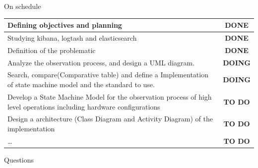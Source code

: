 \documentclass[11pt]{beamer}
\begin{document}
\begin{frame}
	\begin{alertblock}{On schedule}
	
		\begin{tabular}{p{10cm}|c}
			Defining objectives and planning & \textbf{\color{green} DONE}\\
			\hline
			Studying kibana, logtash and elasticsearch & \textbf{\color{green} DONE} \\
			\hline
			Definition of the problematic & \textbf{\color{green} DONE} \\
			\hline
			Analyze the observation process, and design a UML diagram. & \textbf{\color{orange} DOING} \\
			\hline
			Search, compare(Comparative table) and define a Implementation of state machine model and the standard to use. & \textbf{\color{orange} DOING} \\
			\hline
			Develop a State Machine Model for the observation process of high level operations including hardware configurations & \textbf{\color{red} TO DO} \\
			\hline
			Design a architecture (Class Diagram and Activity Diagram) of the implementation & \textbf{\color{red} TO DO} \\
			\hline
			\ldots & \textbf{\color{red} TO DO} \\
		\end{tabular}
	\end{alertblock}
\end{frame}


\begin{frame}{Questions}
\titlepage
\end{frame}
\end{document}
